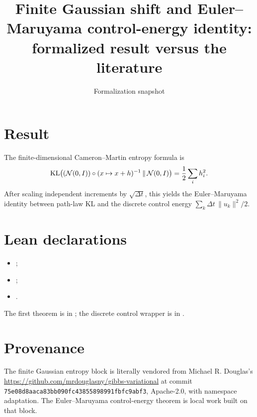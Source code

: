 \title{Finite Gaussian shift and Euler--Maruyama control-energy identity: formalized result versus the literature}
\author{}
\date{Formalization snapshot \snapshot}

\maketitle
{}
\section{Result}
The finite-dimensional Cameron--Martin entropy formula is
\[
 \operatorname{KL}\bigl((\mathcal N(0,I))\circ(x\mapsto x+h)^{-1}\,\Vert\,\mathcal N(0,I)\bigr)
 =\frac12\sum_i h_i^2.
\]
After scaling independent increments by $\sqrt{\Delta t}$, this yields the Euler--Maruyama identity between path-law KL and the discrete control energy $\sum_k\Delta t\,\lVert u_k\rVert^2/2$.

\section{Lean declarations}
\begin{itemize}[leftmargin=2em]
\item {};
\item {};
\item {}.
\end{itemize}
The first theorem is in ; the discrete control wrapper is in .

\section{Provenance}
The finite Gaussian entropy block is literally vendored from Michael R. Douglas's
\url{https://github.com/mrdouglasny/gibbs-variational} at commit
\texttt{75e08d8aaca83bb090fc43855898991fbfc9abf3}, Apache-2.0, with namespace adaptation.  The Euler--Maruyama control-energy theorem is local work built on that block.

